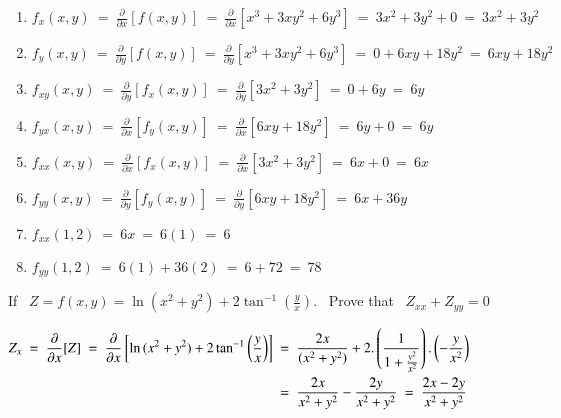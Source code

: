 \documentclass[12pt]{article}
\begin{document}
\vspace{-0.5\baselineskip}
\begin{enumerate}[label=$(\roman*)$]
   \item $f_x(x,y)
   \ = \ \frac{\partial}{\partial{x}}\left[f(x,y)\right]
   \ = \ \frac{\partial}{\partial{x}}\left[x^3+3xy^2+6y^3\right]
   \ = \ 3x^2+3y^2+0
   \ = \ 3x^2+3y^2$
   \vspace{2ex}
   \item $f_y(x,y)
   \ = \ \frac{\partial}{\partial{y}}\left[f(x,y)\right]
   \ = \ \frac{\partial}{\partial{y}}\left[x^3+3xy^2+6y^3\right]
   \ = \ 0+6xy+18y^2
   \ = \ 6xy+18y^2$
   \vspace{2ex}
   \item $f_{xy}(x,y)
   \ = \ \frac{\partial}{\partial{y}}\left[f_x(x,y)\right]
   \ = \ \frac{\partial}{\partial{y}}\left[3x^2+3y^2\right]
   \ = \ 0+6y \ = \ 6y$
   \vspace{2ex}
   \item $f_{yx}(x,y)
   \ = \ \frac{\partial}{\partial{x}}\left[f_y(x,y)\right]
   \ = \ \frac{\partial}{\partial{x}}\left[6xy+18y^2\right]
   \ = \ 6y+0 \ = \ 6y$
   \vspace{2ex}
   \item $f_{xx}(x,y)
   \ = \ \frac{\partial}{\partial{x}}\left[f_x(x,y)\right]
   \ = \ \frac{\partial}{\partial{x}}\left[3x^2+3y^2\right]
   \ = \ 6x+0 \ = \ 6x$
   \vspace{2ex}
   \item $f_{yy}(x,y)
   \ = \ \frac{\partial}{\partial{y}}\left[f_y(x,y)\right]
   \ = \ \frac{\partial}{\partial{y}}\left[6xy+18y^2\right]
   \ = \ 6x+36y$
   \vspace{2ex}
   \item $f_{xx}(1,2)
   \ = \ 6x \ = \ 6(1) \ = \ 6$
   \vspace{2ex}
   \item $f_{yy}(1,2)
   \ = \ 6(1)+36(2) \ = \ 6+72 \ = \ 78$
\end{enumerate}

\vspace{5ex}
\textbf{} If \ $Z=f(x,y) = \ln{(x^2+y^2)+2\tan^{-1}{\left(\frac{y}{x}\right)}}$. \ Prove that \ $Z_{xx} + Z_{yy} = 0$

\vspace{1ex}
$\begin{aligned}
Z_x
\ = \ \frac{\partial}{\partial{x}}[Z]
\ = \ \frac{\partial}{\partial{x}}\left[\ln{(x^2+y^2)+2\tan^{-1}{\left(\frac{y}{x}\right)}}\right]
\ &= \ \frac{2x}{(x^2+y^2)} + 2.\left(\frac{1}{1+\scalebox{1}{$\frac{y^2}{x^2}$}}\right).\left(-\frac{y}{x^2}\right)\\
\ &= \ \frac{2x}{x^2+y^2} - \frac{2y}{x^2+y^2}
\ = \ \frac{2x-2y}{x^2+y^2}
\end{aligned}$
\end{document}
